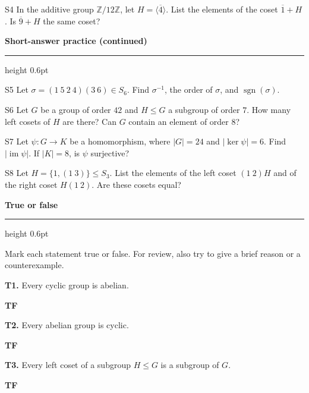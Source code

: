 \documentclass[11pt]{article}
\newcommand{\chapterheading}[1]{%
  \par\vspace{0.5em}
  {\color{courseblue}\Large\bfseries #1}\par\vspace{0.35em}
  {\color{boxborder}\hrule height 0.6pt}\vspace{0.35em}
}
\begin{document}
\vspace{1.8cm}
\begin{exercise}{S4}
In the additive group $\mathbb Z/12\mathbb Z$, let
$H=\langle\overline{4}\rangle$. List the elements of the coset
$\overline{1}+H$. Is $\overline{9}+H$ the same coset?
\end{exercise}
\vspace{1.8cm}
\newpage
\chapterheading{Short-answer practice (continued)}
\begin{exercise}{S5}
Let $\sigma=(1\ 5\ 2\ 4)(3\ 6)\in S_6$.
Find $\sigma^{-1}$, the order of $\sigma$, and $\operatorname{sgn}(\sigma)$.
\end{exercise}
\vspace{1.8cm}
\begin{exercise}{S6}
Let $G$ be a group of order $42$ and $H\leq G$ a subgroup of order $7$.
How many left cosets of $H$ are there? Can $G$ contain an element of order $8$?
\end{exercise}
\vspace{1.8cm}
\begin{exercise}{S7}
Let $\psi:G\to K$ be a homomorphism, where $|G|=24$ and
$|\ker\psi|=6$. Find $|\operatorname{im}\psi|$.
If $|K|=8$, is $\psi$ surjective?
\end{exercise}
\vspace{1.8cm}
\begin{exercise}{S8}
Let $H=\{1,(1\ 3)\}\leq S_3$.
List the elements of the left coset $(1\ 2)H$ and of the right coset
$H(1\ 2)$. Are these cosets equal?
\end{exercise}
\vspace{1.8cm}
\newpage
\chapterheading{True or false}
Mark each statement true or false. For review, also try to give a brief reason or a counterexample.
\par\noindent\textbf{T1.} Every cyclic group is abelian.
\par\nobreak\hfill\textbf{T\qquad F}\par\vspace{0.2em}
\par\noindent\textbf{T2.} Every abelian group is cyclic.
\par\nobreak\hfill\textbf{T\qquad F}\par\vspace{0.2em}
\par\noindent\textbf{T3.} Every left coset of a subgroup $H\leq G$ is a subgroup of $G$.
\par\nobreak\hfill\textbf{T\qquad F}\par\vspace{0.2em}
\end{document}
